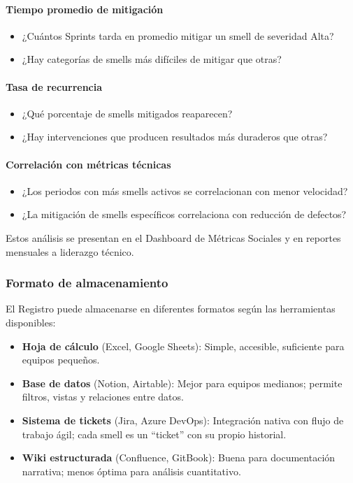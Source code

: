 \paragraph{Tiempo promedio de mitigación}

\begin{itemize}
    \item ¿Cuántos Sprints tarda en promedio mitigar un smell de severidad Alta?
    \item ¿Hay categorías de smells más difíciles de mitigar que otras?
\end{itemize}

\paragraph{Tasa de recurrencia}

\begin{itemize}
    \item ¿Qué porcentaje de smells mitigados reaparecen?
    \item ¿Hay intervenciones que producen resultados más duraderos que otras?
\end{itemize}

\paragraph{Correlación con métricas técnicas}

\begin{itemize}
    \item ¿Los periodos con más smells activos se correlacionan con menor velocidad?
    \item ¿La mitigación de smells específicos correlaciona con reducción de defectos?
\end{itemize}

Estos análisis se presentan en el Dashboard de Métricas Sociales y en reportes mensuales a liderazgo técnico.

\subsubsection{Formato de almacenamiento}

El Registro puede almacenarse en diferentes formatos según las herramientas disponibles:

\begin{itemize}
    \item \textbf{Hoja de cálculo} (Excel, Google Sheets): Simple, accesible, suficiente para equipos pequeños.

    \item \textbf{Base de datos} (Notion, Airtable): Mejor para equipos medianos; permite filtros, vistas y relaciones entre datos.

    \item \textbf{Sistema de tickets} (Jira, Azure DevOps): Integración nativa con flujo de trabajo ágil; cada smell es un ``ticket'' con su propio historial.

    \item \textbf{Wiki estructurada} (Confluence, GitBook): Buena para documentación narrativa; menos óptima para análisis cuantitativo.
\end{itemize}

